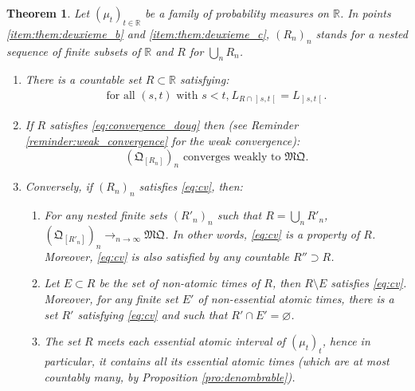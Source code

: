 \documentclass[11pt]{article}
\theoremstyle{plain}
\newtheorem{them}{Theorem}[section]
\theoremstyle{definition}
\newcommand{\como}{\mathfrak{Q}}
\newcommand{\mq}{\mathfrak{MQ}}
\newcommand{\R}{\mathbb{R}}
\newcommand{\op}{\mathopen}
\newcommand{\clo}{\mathclose}
\begin{document}
\begin{them}\label{them:deuxieme_sec} Let $(\mu_t)_{t\in \R}$ be a family of probability measures on $\R$. In points \eqref{item:them:deuxieme_b} and \eqref{item:them:deuxieme_c}, $(R_n)_n$ stands for a nested sequence of finite subsets of\/ $\R$ and $R$ for $\bigcup_nR_n$.

\begin{enumerate}
\item
\label{item:them:deuxieme_a} There is a countable set $R\subset\R$ satisfying:
\begin{gather}\label{eq:convergence_doug}
\text{for all $(s,t)$ with $s<t$,}\ L_{R\cap\op]s,t\clo[}=L_{\op]s,t\clo[}.
\end{gather}

\item
\label{item:them:deuxieme_b} If $R$ satisfies \eqref{eq:convergence_doug} then (see Reminder \ref{reminder:weak_convergence} for the weak convergence):
\begin{equation}\label{eq:cv}
\text{$(\como_{[R_n]})_n$ converges weakly to $\mq$.}
\end{equation}

\item
\label{item:them:deuxieme_c} Conversely, if $(R_n)_n$ satisfies \eqref{eq:cv}, then:
\begin{enumerate}
\item\label{item:ordre_facultatif}
For any nested finite sets $(R'_n)_n$ such that $R=\bigcup_nR'_n$, $(\como_{[R'_n]})_n\to_{n\to\infty}\mq$. In other words, \eqref{eq:cv} is a property of $R$. Moreover, \eqref{eq:cv} is also satisfied by any countable $R''\supset R$.
\item\label{item:inatomique_facultatif}
Let $E\subset R$ be the set of non-atomic times of $R$, then $R\setminus E$ satisfies \eqref{eq:cv}. Moreover, for any finite set $E'$ of non-essential atomic times, there is a set $R'$ satisfying \eqref{eq:cv} and such that $R'\cap E'=\varnothing$.
\item\label{item:essentiel_necessaire}
The set $R$ meets each essential atomic interval of $(\mu_t)_t$, hence in particular, it contains all its essential atomic times (which are at most countably many, by Proposition \ref{pro:denombrable}).
\end{enumerate}
\end{enumerate}
\end{them}
\end{document}
